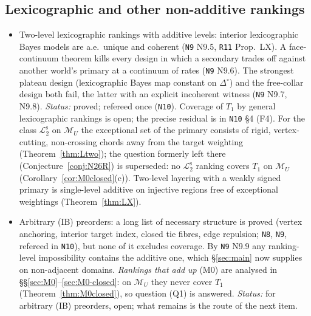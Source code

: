 \documentclass[11pt]{article}
\theoremstyle{definition}
\theoremstyle{remark}
\newcommand{\Di}{\Delta^{\circ}}
\newcommand{\M}{\mathcal M}
\newcommand{\src}[1]{\texttt{#1}}
\newcommand{\Ltwo}{\mathcal L_2^{\mathrm s}}
\begin{document}
\subsection{Lexicographic and other non-additive rankings}
\begin{itemize}[leftmargin=*]
\item Two-level lexicographic rankings with additive levels: interior lexicographic Bayes models are a.e.\ unique and coherent (\src{N9} N9.5, \src{R11} Prop.~LX). A face-continuum theorem kills every design in which a secondary trades off against another world's primary at a continuum of rates (\src{N9} N9.6). The strongest plateau design (lexicographic Bayes map constant on $\Di$) and the free-collar design both fail, the latter with an explicit incoherent witness (\src{N9} N9.7, N9.8). \emph{Status:} proved; refereed once (\src{N10}). Coverage of $T_1$ by general lexicographic rankings is open; the precise residual is in \src{N10} \S4 (F4). For the class $\Ltwo$ on $\M_U$ the exceptional set of the primary consists of rigid, vertex-cutting, non-crossing chords away from the target weighting (Theorem~\ref{thm:Ltwo}); the question formerly left there (Conjecture~\ref{conj:N26R}) is superseded: no $\Ltwo$ ranking covers $T_1$ on $\M_U$ (Corollary~\ref{cor:M0closed}(c)). Two-level layering with a weakly signed primary is single-level additive on injective regions free of exceptional weightings (Theorem~\ref{thm:LX}).
\item Arbitrary (IB) preorders: a long list of necessary structure is proved (vertex anchoring, interior target index, closed tie fibres, edge repulsion; \src{N8}, \src{N9}, refereed in \src{N10}), but none of it excludes coverage. By \src{N9} N9.9 any ranking-level impossibility contains the additive one, which \S\ref{sec:main} now supplies on non-adjacent domains. \emph{Rankings that add up} (M0) are analysed in \S\S\ref{sec:M0}--\ref{sec:M0-closed}: on $\M_U$ they never cover $T_1$ (Theorem~\ref{thm:M0closed}), so question (Q1) is answered. \emph{Status:} for arbitrary (IB) preorders, open; what remains is the route of the next item.

\end{itemize}
\end{document}
